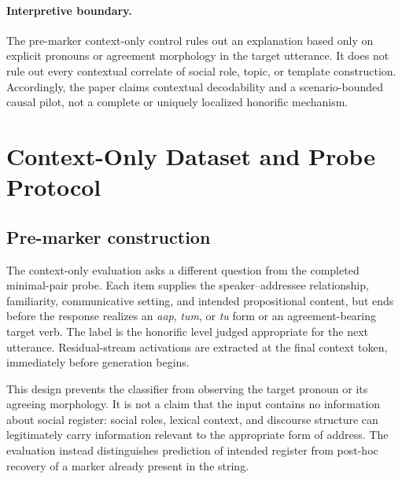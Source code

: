 \documentclass[10pt]{article}
\newcommand{\aap}{\textit{aap}}
\newcommand{\tum}{\textit{tum}}
\newcommand{\tu}{\textit{tu}}
\begin{document}
\paragraph{Interpretive boundary.}
The pre-marker context-only control rules out an explanation based only on
explicit pronouns or agreement morphology in the target utterance. It does not rule out every contextual correlate of
social role, topic, or template construction. Accordingly, the paper claims
contextual decodability and a scenario-bounded causal pilot, not a complete
or uniquely localized honorific mechanism.

\FloatBarrier
\section{Context-Only Dataset and Probe Protocol}

\subsection{Pre-marker construction}

The context-only evaluation asks a different question from the completed
minimal-pair probe. Each item supplies the speaker--addressee relationship,
familiarity, communicative setting, and intended propositional content, but
ends before the response realizes an \aap{}, \tum{}, or \tu{} form or an
agreement-bearing target verb. The label is the honorific level judged
appropriate for the next utterance. Residual-stream activations are extracted
at the final context token, immediately before generation begins.

This design prevents the classifier from observing the target pronoun or its
agreeing morphology. It is not a claim that the input contains no information
about social register: social roles, lexical context, and discourse structure
can legitimately carry information relevant to the appropriate form of address.
The evaluation instead distinguishes prediction of intended register from
post-hoc recovery of a marker already present in the string.
\end{document}
